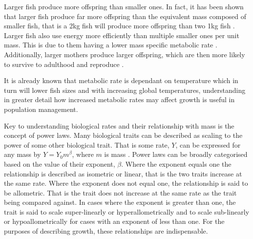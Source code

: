 \documentclass[a4paper, 11pt, hidelinks]{article} %
\begin{document}
	Larger fish produce more offspring than smaller ones.  %
	In fact, it has been shown that larger fish produce far more offspring than the equivalent mass composed of smaller fish,  that is a 2kg fish will produce more offspring than two 1kg fish \parencite{Barneche2018}.
	Larger fish also use energy more efficiently than multiple smaller ones per unit mass.  This is due to them having a lower mass specific metabolic rate \parencite{Peters1983, Kleiber1932, Brown2004}.  
	Additionally, larger mothers produce larger offspring, which are then more likely to survive to adulthood and reproduce \parencite{Hixon2014, Marshall2006}. %
	
	It is already known that metabolic rate is dependant on temperature which in turn will lower fish sizes \parencite{Gillooly2001, Brown2004} and with increasing global temperatures, understanding in greater detail how increased metabolic rates may affect growth is useful in population management.
	
	
	Key to understanding biological rates and their relationship with mass is the concept of power laws. Many biological traits can be described as scaling to the power of some other biological trait.  That is some rate, $Y$, can be expressed for any mass by $Y = Y_0 m^\beta$, where $m$ is mass \parencite{Kleiber1932}.  Power laws can be broadly categorised based on the value of their exponent, $\beta$.  
	Where the exponent equals one the relationship is described as isometric or linear, that is the two traits increase at the same rate.  
	Where the exponent does not equal one, the relationship is said to be allometric.  That is the trait does not increase at the same rate as the trait being compared against.  In cases where the exponent is greater than one, the trait is said to scale super-linearly or hyperallometrically and to scale sub-linearly or hypoallometrically for cases with an exponent of less than one.
	For the purposes of describing growth, these relationships are indispensable.   
	
\end{document}
